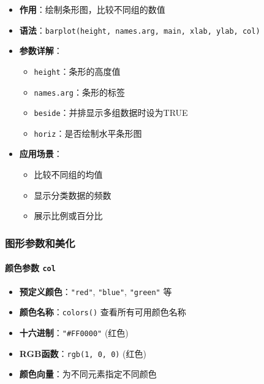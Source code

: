 \documentclass[
  twoside]{book}
\providecommand{\tightlist}{%
  \setlength{\itemsep}{0pt}\setlength{\parskip}{0pt}}
\begin{document}
\begin{itemize}
\tightlist
\item
  \textbf{作用}：绘制条形图，比较不同组的数值
\item
  \textbf{语法}：\texttt{barplot(height,\ names.arg,\ main,\ xlab,\ ylab,\ col)}
\item
  \textbf{参数详解}：

  \begin{itemize}
  \tightlist
  \item
    \texttt{height}：条形的高度值
  \item
    \texttt{names.arg}：条形的标签
  \item
    \texttt{beside}：并排显示多组数据时设为TRUE
  \item
    \texttt{horiz}：是否绘制水平条形图
  \end{itemize}
\item
  \textbf{应用场景}：

  \begin{itemize}
  \tightlist
  \item
    比较不同组的均值
  \item
    显示分类数据的频数
  \item
    展示比例或百分比
  \end{itemize}
\end{itemize}

\hypertarget{ux56feux5f62ux53c2ux6570ux548cux7f8eux5316}{%
\subsubsection{图形参数和美化}\label{ux56feux5f62ux53c2ux6570ux548cux7f8eux5316}}

\hypertarget{ux989cux8272ux53c2ux6570-col}{%
\paragraph{\texorpdfstring{颜色参数 \texttt{col}}{颜色参数 col}}\label{ux989cux8272ux53c2ux6570-col}}

\begin{itemize}
\tightlist
\item
  \textbf{预定义颜色}：\texttt{"red"}, \texttt{"blue"}, \texttt{"green"} 等
\item
  \textbf{颜色名称}：\texttt{colors()} 查看所有可用颜色名称
\item
  \textbf{十六进制}：\texttt{"\#FF0000"} (红色)
\item
  \textbf{RGB函数}：\texttt{rgb(1,\ 0,\ 0)} (红色)
\item
  \textbf{颜色向量}：为不同元素指定不同颜色
\end{itemize}
\end{document}
